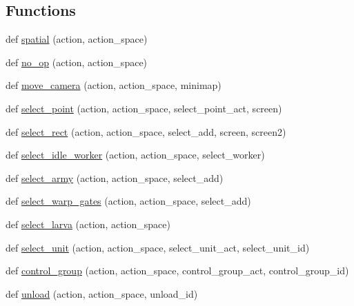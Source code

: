 \subsection*{Functions}
\begin{DoxyCompactItemize}
\item 
def \mbox{\hyperlink{namespacepysc2_1_1lib_1_1actions_ae0d64d56d198a225acde0531c61b9fe0}{spatial}} (action, action\+\_\+space)
\item 
def \mbox{\hyperlink{namespacepysc2_1_1lib_1_1actions_aa1af27a4635aaac6b6cf8318b0b13ca3}{no\+\_\+op}} (action, action\+\_\+space)
\item 
def \mbox{\hyperlink{namespacepysc2_1_1lib_1_1actions_ab895c4b3b0840b1739c9569f89c76c1b}{move\+\_\+camera}} (action, action\+\_\+space, minimap)
\item 
def \mbox{\hyperlink{namespacepysc2_1_1lib_1_1actions_a39189bc77bff9753e5c577908b5aaa81}{select\+\_\+point}} (action, action\+\_\+space, select\+\_\+point\+\_\+act, screen)
\item 
def \mbox{\hyperlink{namespacepysc2_1_1lib_1_1actions_afab1681a2cd67f4f272640e32ccf9e0b}{select\+\_\+rect}} (action, action\+\_\+space, select\+\_\+add, screen, screen2)
\item 
def \mbox{\hyperlink{namespacepysc2_1_1lib_1_1actions_a850bf8decf364fdf7fd2bb57fdf7f68e}{select\+\_\+idle\+\_\+worker}} (action, action\+\_\+space, select\+\_\+worker)
\item 
def \mbox{\hyperlink{namespacepysc2_1_1lib_1_1actions_a55445acf167169d48bfc90afdcd703f4}{select\+\_\+army}} (action, action\+\_\+space, select\+\_\+add)
\item 
def \mbox{\hyperlink{namespacepysc2_1_1lib_1_1actions_afc7eeb20fb416749432c939c229cd861}{select\+\_\+warp\+\_\+gates}} (action, action\+\_\+space, select\+\_\+add)
\item 
def \mbox{\hyperlink{namespacepysc2_1_1lib_1_1actions_ab55a64b49122548d923705e802d63a03}{select\+\_\+larva}} (action, action\+\_\+space)
\item 
def \mbox{\hyperlink{namespacepysc2_1_1lib_1_1actions_a978d483e32717353b683dfa14b5e7ff9}{select\+\_\+unit}} (action, action\+\_\+space, select\+\_\+unit\+\_\+act, select\+\_\+unit\+\_\+id)
\item 
def \mbox{\hyperlink{namespacepysc2_1_1lib_1_1actions_a3dfc90aaa086b113d41fe641d7afb0d4}{control\+\_\+group}} (action, action\+\_\+space, control\+\_\+group\+\_\+act, control\+\_\+group\+\_\+id)
\item 
def \mbox{\hyperlink{namespacepysc2_1_1lib_1_1actions_aa43c5d9a658772be725451a5b9c1e249}{unload}} (action, action\+\_\+space, unload\+\_\+id)

\end{DoxyCompactItemize}

